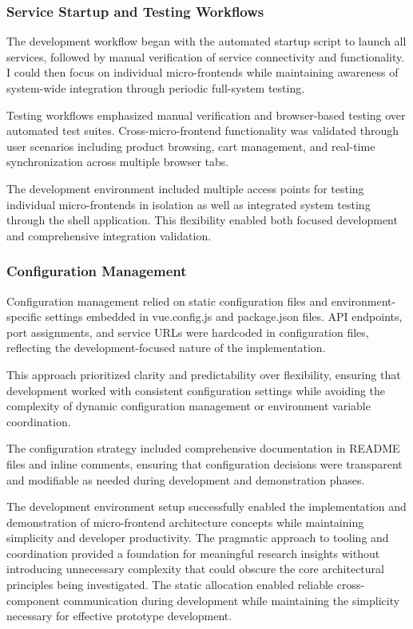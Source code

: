 \documentclass[12pt,a4paper]{report}
\begin{document}
\subsubsection{Service Startup and Testing Workflows}

The development workflow began with the automated startup script to launch all services, followed by manual verification of service connectivity and functionality. I could then focus on individual micro-frontends while maintaining awareness of system-wide integration through periodic full-system testing.

Testing workflows emphasized manual verification and browser-based testing over automated test suites. Cross-micro-frontend functionality was validated through user scenarios including product browsing, cart management, and real-time synchronization across multiple browser tabs.

The development environment included multiple access points for testing individual micro-frontends in isolation as well as integrated system testing through the shell application. This flexibility enabled both focused development and comprehensive integration validation.

\subsubsection{Configuration Management}

Configuration management relied on static configuration files and environment-specific settings embedded in vue.config.js and package.json files. API endpoints, port assignments, and service URLs were hardcoded in configuration files, reflecting the development-focused nature of the implementation.

This approach prioritized clarity and predictability over flexibility, ensuring that development worked with consistent configuration settings while avoiding the complexity of dynamic configuration management or environment variable coordination.

The configuration strategy included comprehensive documentation in README files and inline comments, ensuring that configuration decisions were transparent and modifiable as needed during development and demonstration phases.

The development environment setup successfully enabled the implementation and demonstration of micro-frontend architecture concepts while maintaining simplicity and developer productivity. The pragmatic approach to tooling and coordination provided a foundation for meaningful research insights without introducing unnecessary complexity that could obscure the core architectural principles being investigated. The static allocation enabled reliable cross-component communication during development while maintaining the simplicity necessary for effective prototype development.
\end{document}
